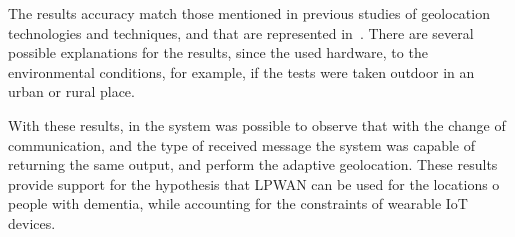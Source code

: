 The results accuracy match those mentioned in previous studies of geolocation technologies and techniques, and that are represented in~.\newline 
There are several possible explanations for the results, since the used hardware, to the environmental conditions, for example, if the tests were taken outdoor in an urban or rural place. 

With these results, in the system  was possible to observe that with the change of communication, and the type of received message the system was capable of returning the same output, and perform the adaptive geolocation.\newline 
These results provide support for the hypothesis that LPWAN can be used for the locations o people with dementia, while accounting for the constraints of wearable IoT devices.































